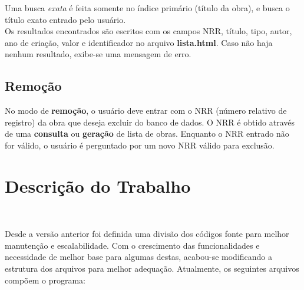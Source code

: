 \documentclass{article}
\begin{document}
Uma busca \textit{exata} é feita somente no índice primário (título da obra), e busca o título exato entrado pelo usuário.\\

Os resultados encontrados são escritos com os campos NRR, título, tipo, autor, ano de criação, valor e identificador no arquivo \textbf{lista.html}. Caso não haja nenhum resultado, exibe-se uma mensagem de erro.

\subsection{Remoção}

No modo de \textbf{remoção}, o usuário deve entrar com o NRR (número relativo de registro) da obra que deseja excluir do banco de dados. O NRR é obtido através de uma \textbf{consulta} ou \textbf{geração} de lista de obras. Enquanto o NRR entrado não for válido, o usuário é perguntado por um novo NRR válido para exclusão.

\section{Descrição do Trabalho}\

Desde a versão anterior foi definida uma divisão dos códigos fonte para melhor manutenção e escalabilidade. Com o crescimento das funcionalidades e necessidade de melhor base para algumas destas, acabou-se modificando a estrutura dos arquivos para melhor adequação. Atualmente, os seguintes arquivos compõem o programa:
\end{document}
